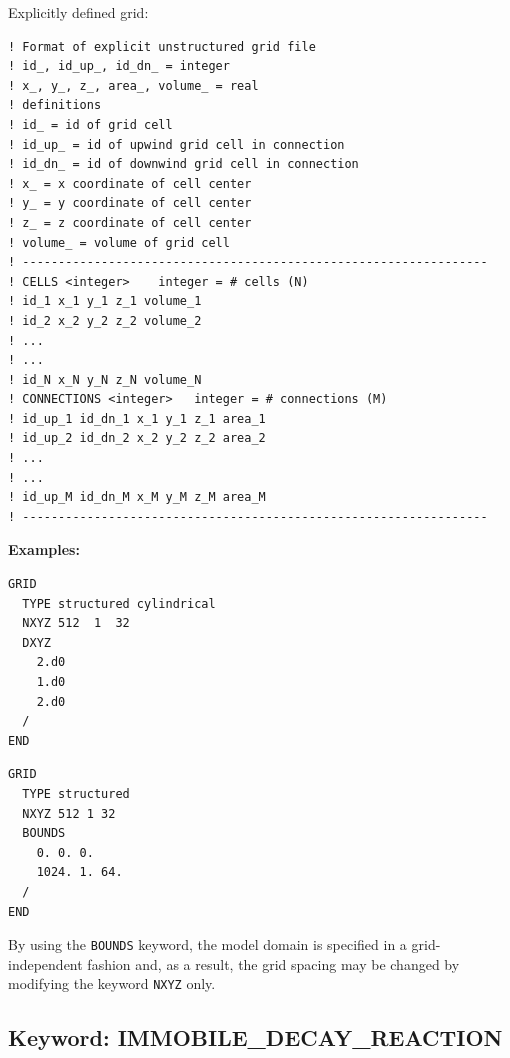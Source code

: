 \begin{mdframed}

Explicitly defined grid:

\footnotesize
\begin{verbatim}
! Format of explicit unstructured grid file
! id_, id_up_, id_dn_ = integer
! x_, y_, z_, area_, volume_ = real
! definitions
! id_ = id of grid cell
! id_up_ = id of upwind grid cell in connection
! id_dn_ = id of downwind grid cell in connection
! x_ = x coordinate of cell center
! y_ = y coordinate of cell center
! z_ = z coordinate of cell center
! volume_ = volume of grid cell
! -----------------------------------------------------------------
! CELLS <integer>    integer = # cells (N)
! id_1 x_1 y_1 z_1 volume_1
! id_2 x_2 y_2 z_2 volume_2
! ...
! ...
! id_N x_N y_N z_N volume_N
! CONNECTIONS <integer>   integer = # connections (M)
! id_up_1 id_dn_1 x_1 y_1 z_1 area_1
! id_up_2 id_dn_2 x_2 y_2 z_2 area_2
! ...
! ...
! id_up_M id_dn_M x_M y_M z_M area_M
! -----------------------------------------------------------------
\end{verbatim}
\normalsize
\end{mdframed}

\begin{mdframed}

\noindent
{\bf Examples:}
\footnotesize
\begin{verbatim}
GRID
  TYPE structured cylindrical
  NXYZ 512  1  32
  DXYZ
    2.d0
    1.d0
    2.d0
  /
END
\end{verbatim}

\begin{verbatim}
GRID
  TYPE structured
  NXYZ 512 1 32
  BOUNDS
    0. 0. 0.
    1024. 1. 64.
  /
END
\end{verbatim}
\normalsize
\end{mdframed}

\noindent
By using the {\tt BOUNDS} keyword, the model domain is specified in a grid-independent fashion and, as a result, the grid spacing may be changed by modifying the keyword {\tt NXYZ} only.

\hyperlink{target_key}{\return}

\hyperlink{target_input_file}{\returnb}


\newpage
\protect\hypertarget{target_immob}{}

\subsection{Keyword: IMMOBILE\_DECAY\_REACTION}

